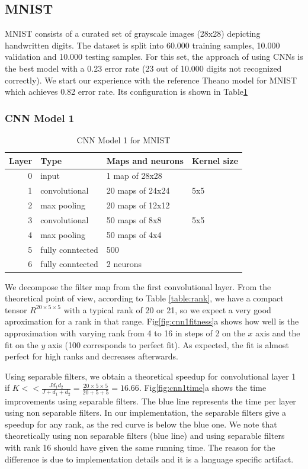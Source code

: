 
\subsection{MNIST}
MNIST consists of a curated set of grayscale images (28x28) depicting handwritten digits.
The dataset is split into 60.000 training samples, 10.000 validation and 
10.000 testing samples. For this set, the approach of \cite{DBLP:journals/corr/abs-1202-2745} using CNNs is the best  model with a 0.23 error rate (23 out of 10.000 digits not recognized correctly).
We start our experience with the reference Theano model for MNIST which achieves 0.82 error rate. Its configuration is shown in Table\ref{fig:cnn1}
\subsubsection{CNN Model 1}
\begin{table}[h!]
\centering
\begin{tabular}{@{}rlll@{}}\toprule
Layer & Type & Maps and neurons& Kernel size \\ \midrule
0 & input & 1 map of 28x28 &\\
1& convolutional & 20 maps of 24x24 & 5x5\\
2 & max pooling & 20 maps of 12x12 &  \\
3 & convolutional & 50 maps of 8x8& 5x5 \\
4 & max pooling & 50 maps of 4x4&  \\ 
5 & fully conntected& 500 & \\
6 & fully conntected & 2 neurons & \\ \bottomrule
\end{tabular}
\caption{CNN Model 1 for MNIST}
\label{fig:cnn1}
\end{table}

We decompose the filter map from the first convolutional layer. From the theoretical point of view, according to Table \ref{table:rank}, we have a compact tensor $R^{20\times 5 \times 5}$ with a typical rank of 20 or 21, so we expect a very good aproximation for a rank in that range. 
Fig\ref{fig:cnn1fitness}a shows how well is the approximation with varying rank from 4 to 16 in steps of 2 on the $x$ axis and the fit on the $y$ axis (100 corresponds to perfect fit). As expected, the fit is almost perfect for high ranks and decreases afterwards.

Using separable filters, we obtain a theoretical speedup for convolutional layer 1 if $K<< \frac{Jd_{1}d_{2}}{J +d_{1}+d_{2}} = \frac{20\times 5\times 5}{20 + 5 + 5} = 16.66$. Fig\ref{fig:cnn1time}a shows the time improvements using separable filters. The blue line represents the time per layer using non separable filters. In our implementation, the separable filters give a speedup for any rank, as the red curve is below the blue one. 
We note that theoretically using non separable filters (blue line) and using separable filters with rank 16 should have given the same running time. The reason for the difference is due to implementation details and it is a language specific artifact.

